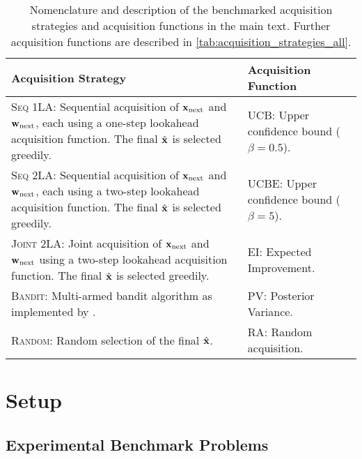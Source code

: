 \begin{table*}[t]
    \footnotesize
    \centering
    \caption{
    Nomenclature and description of the benchmarked acquisition strategies and acquisition functions in the main text. Further acquisition functions are described in \cref{tab:acquisition_strategies_all}.
    }

    \vspace{0.5em}
    
    \renewcommand{\arraystretch}{1.3}

    \begin{tabularx}{\textwidth}{p{}|X}\toprule
        \textbf{Acquisition Strategy} & \textbf{Acquisition Function} \\ \midrule
        \textsc{Seq 1LA}: Sequential acquisition of ${\mathbf{x}}_\text{next}$ and  ${\mathbf{w}}_\text{next}$, each using a one-step lookahead acquisition function. The final $\hat{{\mathbf{x}}}$ is selected greedily. & \textsc{UCB}: Upper confidence bound ($\beta = 0.5$). \\
        \textsc{Seq 2LA}: Sequential acquisition of ${\mathbf{x}}_\text{next}$ and  ${\mathbf{w}}_\text{next}$, each using a two-step lookahead acquisition function. The final $\hat{{\mathbf{x}}}$ is selected greedily. & \textsc{UCBE}: Upper confidence bound ($\beta = 5$). \\
        \textsc{Joint 2LA}: Joint acquisition of ${\mathbf{x}}_\text{next}$ and  ${\mathbf{w}}_\text{next}$ using a two-step lookahead acquisition function. The final $\hat{{\mathbf{x}}}$ is selected greedily. & \textsc{EI}: Expected Improvement. \\
        \textsc{Bandit}: Multi-armed bandit algorithm as implemented by \citet{wang_identifying_2024}. & \textsc{PV}: Posterior Variance. \\
        \textsc{Random}: Random selection of the final $\hat{{\mathbf{x}}}$. & \textsc{RA}: Random acquisition.\\
        \bottomrule
    \end{tabularx}
    \label{tab:acquisition_strategies}
\end{table*}
\section{Setup}
%
\subsection{Experimental Benchmark Problems}

